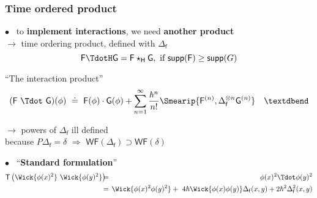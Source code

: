 \documentclass[9pt]{beamer}
\newcommand{\WF}{\mathsf{WF}} %
\newcommand{\supp}{\mathsf{supp}} %
\newcommand{\Fsf}{\mathsf{F}}
\newcommand{\Gsf}{\mathsf{G}}
\newcommand{\Hsf}{\mathsf{H}}
\newcommand{\Tsf}{\mathsf{T}}
\newcommand{\fsf}{\mathsf{f}}
\begin{document}
\begin{frame}

\frametitle{Time ordered product}

\vfill

$\bullet$ \ to \textbf{implement interactions}, we need \textbf{another product} \\
\hspace*{8pt} $\to$ time ordering product, defined with $\Delta_\fsf$ 
\vspace*{-8pt}
\begin{equation*}
\Fsf \TdotH \Gsf = \Fsf \star_\Hsf \Gsf, \mbox{ if } \supp(\Fsf) \geq \supp(G)
\end{equation*}

\begin{block}{``The interaction product''}
\vspace*{-13pt}
\begin{equation*}
(\Fsf \ \Tdot \ \Gsf)(\phi) \ \doteq \ \Fsf(\phi) \cdot \Gsf(\phi) + \sum_{n=1}^{\infty} \frac{\hbar^n}{n!} \Smearip{\Fsf^{(n)},\Delta_{\fsf}^{\otimes n} \Gsf^{(n)}} \quad \textdbend  
\vspace*{-6pt}
\end{equation*}
\end{block}

\hspace*{8pt} $\to$ powers of $\Delta_\fsf$ ill defined \\
\hspace*{20pt} because $P \Delta_\fsf = \delta$ $\Rightarrow$ $\WF(\Delta_\fsf) \supset \WF(\delta)$ \\

\vfill

$\bullet$ \ ``\textbf{Standard formulation}'' \\[-20pt]
%
\begin{eqnarray*}
\Tsf \left( \Wick{\phi(x)^2} \ \Wick{\phi(y)^2} \right) \hspace*{-6pt} &=& \hspace*{-6pt} \phi(x)^2 \Tdot \phi(y)^2 \\ 
&=& \hspace*{-6pt} \Wick{\phi(x)^2 \phi(y)^2} + \ 4 \hbar \Wick{\phi(x) \phi(y)} \Delta_\fsf(x,y) + 2 \hbar^2 \Delta^2_\fsf(x,y)
\end{eqnarray*}

\vfill

\end{frame}  

\end{document}
